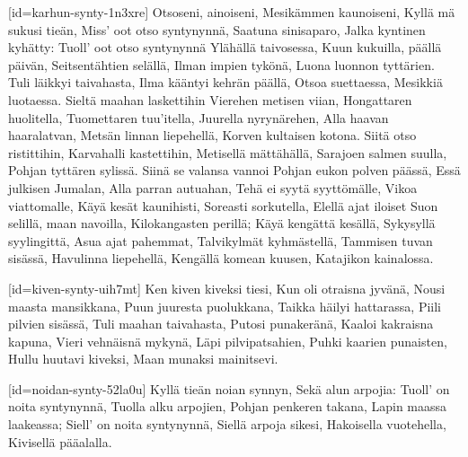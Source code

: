 [id={karhun-synty-1n3xre}]
  \beginverse
    Otsoseni, ainoiseni,
    Mesikämmen kaunoiseni,
    Kyllä mä sukusi tieän,
    Miss' oot otso syntynynnä,
    Saatuna sinisaparo,
    Jalka kyntinen kyhätty:
    Tuoll' oot otso syntynynnä
    Ylähällä taivosessa,
    Kuun kukuilla, päällä päivän,
    Seitsentähtien selällä,
    Ilman impien tykönä,
    Luona luonnon tyttärien.
  \endverse
  \beginverse
    Tuli läikkyi taivahasta,
    Ilma kääntyi kehrän päällä,
    Otsoa suettaessa,
    Mesikkiä luotaessa.
    Sieltä maahan laskettihin
    Vierehen metisen viian,
    Hongattaren huolitella,
    Tuomettaren tuu'itella,
    Juurella nyrynärehen,
    Alla haavan haaralatvan,
    Metsän linnan liepehellä,
    Korven kultaisen kotona.
  \endverse
  \beginverse
    Siitä otso ristittihin,
    Karvahalli kastettihin,
    Metisellä mättähällä,
    Sarajoen salmen suulla,
    Pohjan tyttären sylissä.
    Siinä se valansa vannoi
    Pohjan eukon polven päässä,
    Essä julkisen Jumalan,
    Alla parran autuahan,
    Tehä ei syytä syyttömälle,
    Vikoa viattomalle,
    Käyä kesät kaunihisti,
    Soreasti sorkutella,
    Elellä ajat iloiset
    Suon selillä, maan navoilla,
    Kilokangasten perillä;
    Käyä kengättä kesällä,
    Sykysyllä syylingittä,
    Asua ajat pahemmat,
    Talvikylmät kyhmästellä,
    Tammisen tuvan sisässä,
    Havulinna liepehellä,
    Kengällä komean kuusen,
    Katajikon kainalossa.
  \endverse
\endsong


[id={kiven-synty-uih7mt}]
  \beginverse
    Ken kiven kiveksi tiesi,
    Kun oli otraisna jyvänä,
    Nousi maasta mansikkana,
    Puun juuresta puolukkana,
    Taikka häilyi hattarassa,
    Piili pilvien sisässä,
    Tuli maahan taivahasta,
    Putosi punakeränä,
    Kaaloi kakraisna kapuna,
    Vieri vehnäisnä mykynä,
    Läpi pilvipatsahien,
    Puhki kaarien punaisten,
    Hullu huutavi kiveksi,
    Maan munaksi mainitsevi.
  \endverse
\endsong


[id={noidan-synty-52la0u}]
  \beginverse
    Kyllä tieän noian synnyn,
    Sekä alun arpojia:
    Tuoll' on noita syntynynnä,
    Tuolla alku arpojien,
    Pohjan penkeren takana,
    Lapin maassa laakeassa;
    Siell' on noita syntynynnä,
    Siellä arpoja sikesi,
    Hakoisella vuotehella,
    Kivisellä pääalalla.
  \endverse
\endsong


